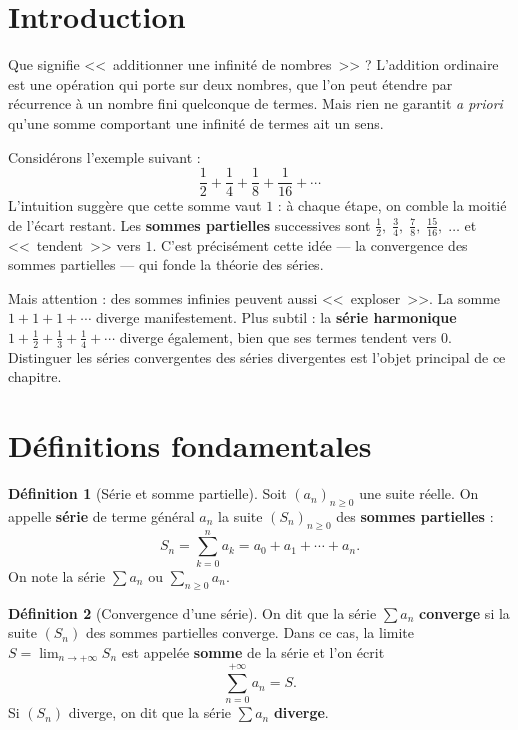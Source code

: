 \documentclass[12pt,a4paper,openany]{book}
\theoremstyle{definition}
\newtheorem{definition}{Définition}[chapter]
\begin{document}
\section*{Introduction}

Que signifie <<~additionner une infinité de nombres~>> ? L'addition ordinaire est une
opération qui porte sur deux nombres, que l'on peut étendre par récurrence à un nombre
fini quelconque de termes. Mais rien ne garantit \emph{a priori} qu'une somme comportant
une infinité de termes ait un sens.

Considérons l'exemple suivant :
\[
  \frac{1}{2} + \frac{1}{4} + \frac{1}{8} + \frac{1}{16} + \cdots
\]
L'intuition suggère que cette somme vaut $1$ : à chaque étape, on comble la moitié de
l'écart restant. Les \textbf{sommes partielles} successives sont
$\frac{1}{2},\; \frac{3}{4},\; \frac{7}{8},\; \frac{15}{16},\; \ldots$
et <<~tendent~>> vers $1$. C'est précisément cette idée --- la convergence des sommes
partielles --- qui fonde la théorie des séries.

Mais attention : des sommes infinies peuvent aussi <<~exploser~>>. La somme
$1 + 1 + 1 + \cdots$ diverge manifestement. Plus subtil : la \textbf{série harmonique}
$1 + \frac{1}{2} + \frac{1}{3} + \frac{1}{4} + \cdots$ diverge également, bien que
ses termes tendent vers $0$. Distinguer les séries convergentes des séries divergentes
est l'objet principal de ce chapitre.

\section{Définitions fondamentales}\label{sec:series:def}

\begin{definition}[Série et somme partielle]\label{def:serie}
  Soit $(a_n)_{n \geq 0}$ une suite réelle. On appelle \textbf{série} de terme
  général $a_n$ la suite $(S_n)_{n \geq 0}$ des \textbf{sommes partielles} :
  \[
    S_n = \sum_{k=0}^{n} a_k = a_0 + a_1 + \cdots + a_n.
  \]
  On note la série $\sum a_n$ ou $\sum_{n \geq 0} a_n$.
\end{definition}

\begin{definition}[Convergence d'une série]\label{def:convergence-serie}
  On dit que la série $\sum a_n$ \textbf{converge} si la suite $(S_n)$ des sommes
  partielles converge. Dans ce cas, la limite $S = \lim_{n \to +\infty} S_n$ est
  appelée \textbf{somme} de la série et l'on écrit
  \[
    \sum_{n=0}^{+\infty} a_n = S.
  \]
  Si $(S_n)$ diverge, on dit que la série $\sum a_n$ \textbf{diverge}.
\end{definition}
\end{document}
